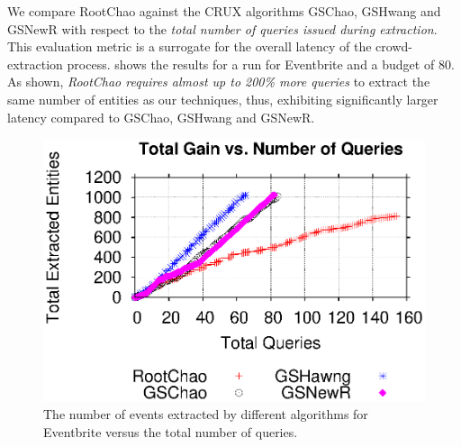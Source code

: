 We compare RootChao against the CRUX algorithms GSChao, GSHwang and GSNewR with respect to the {\em total number of queries issued during extraction}. This evaluation metric is a surrogate for the overall latency of the crowd-extraction process.  shows the results for a run for Eventbrite and a budget of 80. As shown, {\em RootChao requires almost up to 200\% more queries} to extract the same number of entities as our techniques, thus, exhibiting significantly larger latency compared to GSChao, GSHwang and GSNewR.

\begin{figure}[t]
	\begin{center}
	\includegraphics[clip,scale=0.4]{figs/gain_rounds.eps}
	\caption{The number of events extracted by different algorithms for Eventbrite versus the total number of queries.}
	\label{fig:rounds}
	\end{center}
	\vspace{-5pt}
\end{figure}

